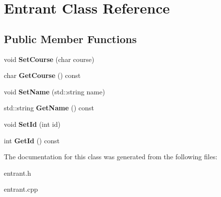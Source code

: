 \hypertarget{classEntrant}{\section{\-Entrant \-Class \-Reference}
\label{classEntrant}
}
\subsection*{\-Public \-Member \-Functions}
\begin{DoxyCompactItemize}
\item 
\hypertarget{classEntrant_a948d4853a46f1871b938b086d7e3d299}{void {\bfseries \-Set\-Course} (char course)}\label{classEntrant_a948d4853a46f1871b938b086d7e3d299}

\item 
\hypertarget{classEntrant_a09bfff64f7d0cff04c7cbf4bc90be40f}{char {\bfseries \-Get\-Course} () const }\label{classEntrant_a09bfff64f7d0cff04c7cbf4bc90be40f}

\item 
\hypertarget{classEntrant_aded5c26726ac5680d4d4c08de78d3b88}{void {\bfseries \-Set\-Name} (std\-::string name)}\label{classEntrant_aded5c26726ac5680d4d4c08de78d3b88}

\item 
\hypertarget{classEntrant_a79ae7234ca25dd833ce16229805c2993}{std\-::string {\bfseries \-Get\-Name} () const }\label{classEntrant_a79ae7234ca25dd833ce16229805c2993}

\item 
\hypertarget{classEntrant_a444fe74d82503f6bc51fdbfbaf00ed3b}{void {\bfseries \-Set\-Id} (int id)}\label{classEntrant_a444fe74d82503f6bc51fdbfbaf00ed3b}

\item 
\hypertarget{classEntrant_a412ae82c38d6a836511f78a8c6f48df4}{int {\bfseries \-Get\-Id} () const }\label{classEntrant_a412ae82c38d6a836511f78a8c6f48df4}

\end{DoxyCompactItemize}


\-The documentation for this class was generated from the following files\-:\begin{DoxyCompactItemize}
\item 
entrant.\-h\item 
entrant.\-cpp\end{DoxyCompactItemize}
